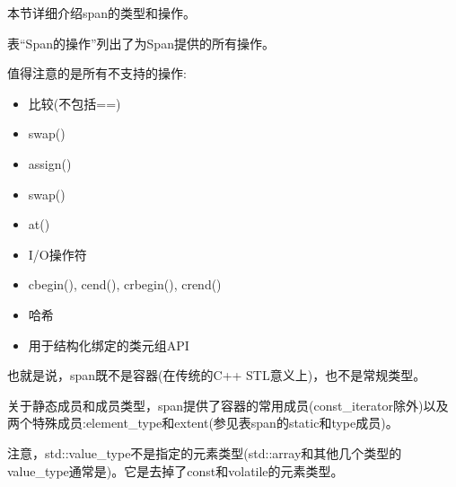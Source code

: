 
本节详细介绍span的类型和操作。


表“Span的操作”列出了为Span提供的所有操作。

值得注意的是所有不支持的操作:

\begin{itemize}
\item
比较(不包括==)

\item
swap()

\item
assign()

\item
swap()

\item
at()

\item
I/O操作符

\item
cbegin(), cend(), crbegin(), crend()

\item
哈希

\item
用于结构化绑定的类元组API
\end{itemize}

也就是说，span既不是容器(在传统的C++ STL意义上)，也不是常规类型。

关于静态成员和成员类型，span提供了容器的常用成员(const\_iterator除外)以及两个特殊成员:element\_type和extent(参见表span的static和type成员)。

注意，std::value\_type不是指定的元素类型(std::array和其他几个类型的value\_type通常是)。它是去掉了const和volatile的元素类型。

